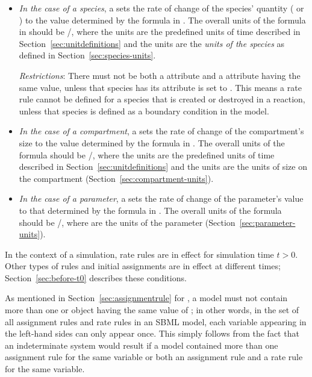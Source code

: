 \begin{itemize}
  
\item \emph{In the case of a species}, a \RateRule sets the rate
  of change of the species' quantity ( or
  ) to the value determined by the
  formula in .  The overall units of the formula in
   should be /, where the  units are
  the predefined units of time described in
  Section~\ref{sec:unitdefinitions} and the  units are the \emph{units of the species} as defined
  in Section~\ref{sec:species-units}.
  
  \emph{Restrictions}: There must not be both a \RateRule
   attribute and a \SpeciesReference {}
  attribute having the same value, unless that species has its
   attribute is set to .  This
  means a rate rule cannot be defined for a species that is
  created or destroyed in a reaction, unless that species is
  defined as a boundary condition in the model.
  
\item \emph{In the case of a compartment}, a \RateRule sets the
  rate of change of the compartment's size to the value determined
  by the formula in .  The overall units of the
  formula should be /, where the
   units are the predefined units of time described
  in Section~\ref{sec:unitdefinitions} and the 
  units are the units of size on the compartment
  (Section~\ref{sec:compartment-units}).

\item \emph{In the case of a parameter}, a \RateRule sets the rate
  of change of the parameter's value to that determined by the
  formula in .  The overall units of the formula should
  be /, where  are the
  units of the parameter (Section~\ref{sec:parameter-units}).

\end{itemize}

In the context of a simulation, rate rules are in effect for
simulation time $t > 0$.  Other types of rules and initial
assignments are in effect at different times;
Section~\ref{sec:before-t0} describes these conditions.

As mentioned in Section~\ref{sec:assignmentrule} for
\AssignmentRule, a model must not contain more than one \RateRule
or \AssignmentRule object having the same value of
; in other words, in the set of all assignment
rules and rate rules in an SBML model, each variable appearing in
the left-hand sides can only appear once.  This simply follows
from the fact that an indeterminate system would result if a model
contained more than one assignment rule for the same variable or
both an assignment rule and a rate rule for the same variable.


